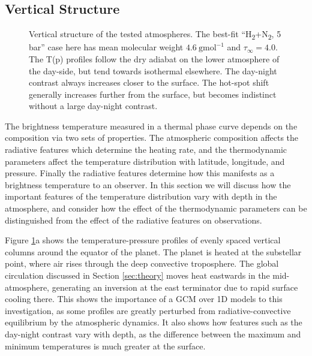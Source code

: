 \subsection{Vertical Structure}\label{sec:vertical_structure}
\begin{figure}
\caption{Vertical structure of the tested atmospheres. The best-fit ``H\textsubscript{2}+N\textsubscript{2}, 5 bar'' case here has mean molecular weight $4.6\ \mathrm{gmol}^{-1}$ and $\tau_{\infty} = 4.0$. The T(p) profiles follow the dry adiabat on the lower atmosphere of the day-side, but tend towards isothermal elsewhere. The day-night contrast always increases closer to the surface. The hot-spot shift generally increases further from the surface, but becomes indistinct without a large day-night contrast. \label{fig:pressure_variation}}
\end{figure}

The brightness temperature measured in a thermal phase curve depends on the composition via two sets of properties. The atmospheric composition affects the radiative features which determine the heating rate, and the thermodynamic parameters affect the temperature distribution with latitude, longitude, and pressure. Finally the radiative features determine how this manifests as a brightness temperature to an observer. In this section we will discuss how the important features of the temperature distribution vary with depth in the atmosphere, and consider how the effect of the thermodynamic parameters can be distinguished from the effect of the radiative features on observations.

Figure \ref{fig:pressure_variation}a shows the temperature-pressure profiles of evenly spaced vertical columns around the equator of the planet. The planet is heated at the substellar point, where air rises through the deep convective troposphere. The global circulation discussed in Section \ref{sec:theory} moves heat eastwards in the mid-atmosphere, generating an inversion at the east terminator due to rapid surface cooling there. This shows the importance of a GCM over 1D models to this investigation, as some profiles are greatly perturbed from radiative-convective equilibrium by the atmospheric dynamics. It also shows how features such as the day-night contrast vary with depth, as the difference between the maximum and minimum temperatures is much greater at the surface.


